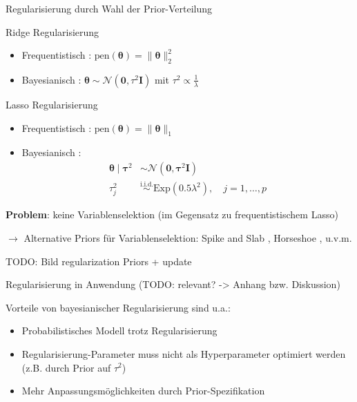 \documentclass[
  ignorenonframetext,
  aspectratio=169,
]{beamer}
\providecommand{\tightlist}{%
  \setlength{\itemsep}{0pt}\setlength{\parskip}{0pt}}
\newcommand{\bnull}{\bm{0}}
\newcommand{\bI}{\bm{I}}
\newcommand{\Ncal}{\mathcal{N}}
\newcommand{\btheta}{\bm{\theta}}
\newcommand{\btaus}{\bm{\tau}^2}
\newcommand{\taus}{\tau^2}
\begin{document}
\begin{frame}{Regularisierung durch Wahl der Prior-Verteilung}
\protect{}\label{regularisierung-durch-wahl-der-prior-verteilung}
\begin{block}{Ridge Regularisierung}
\protect{}\label{ridge-regularisierung}
\begin{itemize}
\item
  Frequentistisch \autocite{hoerl_ridge_1970,hoerl_ridge_1970-1}:
  \(\text{pen}(\btheta) = \|\btheta\|_2^2\)
\item
  Bayesianisch \autocite{mackay_bayesian_1992}:
  \(\btheta \sim \Ncal(\bnull, \taus \bI)\) mit
  \(\taus \propto \frac{1}{\lambda}\)
\end{itemize}
\end{block}

\begin{block}{Lasso Regularisierung}
\protect{}\label{lasso-regularisierung}
\begin{itemize}
\item
  Frequentistisch \autocite{tibshirani_regression_1996}:
  \(\text{pen}(\btheta) = \|\btheta\|_1\)
\item
  Bayesianisch \autocite{park_bayesian_2008}: \[
  \begin{aligned}
  \btheta \mid \btaus &\sim \Ncal(\bnull, \btaus \bI) \\
  \taus_j &\overset{\text{i.i.d.}}{\sim} \text{Exp}(0.5 \lambda^2), \quad j = 1, \dots, p
  \end{aligned}
  \]
\end{itemize}
\end{block}

\textbf{Problem}: keine Variablenselektion (im Gegensatz zu
frequentistischem Lasso)

\(\to\) Alternative Priors für Variablenselektion: Spike and Slab
\autocite{mitchell_bayesian_1988}, Horseshoe
\autocite{carvalho_horseshoe_2010}, u.v.m.

TODO: Bild regularization Priors + update
\end{frame}

\begin{frame}{Regularisierung in Anwendung}
\protect{}\label{regularisierung-in-anwendung}
(TODO: relevant? -\textgreater{} Anhang bzw. Diskussion)

Vorteile von bayesianischer Regularisierung sind u.a.:

\begin{itemize}
\tightlist
\item
  Probabilistisches Modell trotz Regularisierung
\item
  Regularisierung-Parameter muss nicht als Hyperparameter optimiert
  werden (z.B. durch Prior auf \(\taus\))
\item
  Mehr Anpassungsmöglichkeiten durch Prior-Spezifikation
\end{itemize}
\end{frame}
\end{document}

